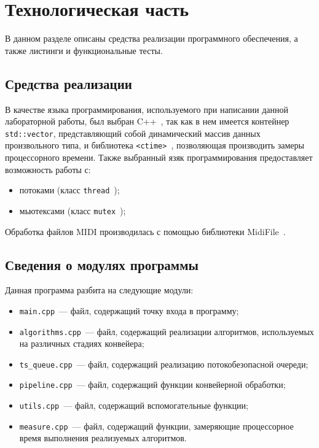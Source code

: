 \chapter{Технологическая часть}

В данном разделе описаны средства реализации программного обеспечения, а также листинги и функциональные тесты.

\section{Средства реализации}

В качестве языка программирования, используемого при написании данной лабораторной работы, был выбран C++~\cite{cpp-lang}, так как в нем имеется контейнер \texttt{std::vector}, представляющий собой динамический массив данных произвольного типа, и библиотека \texttt{<ctime>}~\cite{cpp-ctime}, позволяющая производить замеры процессорного времени.
Также выбранный язяк программирования предоставляет возможность работы с:
\begin{itemize}
	\item потоками (класс \texttt{thread}~\cite{cpp-thread});
	\item мьютексами (класс \texttt{mutex}~\cite{cpp-mutex});
\end{itemize}

Обработка файлов MIDI производилась с помощью библиотеки MidiFile~\cite{midifile}.

\section{Сведения о модулях программы}

Данная программа разбита на следующие модули:

\begin{itemize}
	\item \texttt{main.cpp}~--- файл, содержащий точку входа в программу;
	\item \texttt{algorithms.cpp}~--- файл, содержащий реализации алгоритмов, используемых на различных стадиях конвейера;
	\item \texttt{ts\_queue.cpp}~--- файл, содержащий реализацию потокобезопасной очереди;
	\item \texttt{pipeline.cpp}~--- файл, содержащий функции конвейерной обработки;
	\item \texttt{utils.cpp}~--- файл, содержащий вспомогательные функции;
	\item \texttt{measure.cpp}~--- файл, содержащий функции, замеряющие процессорное время выполнения реализуемых алгоритмов.
\end{itemize}

